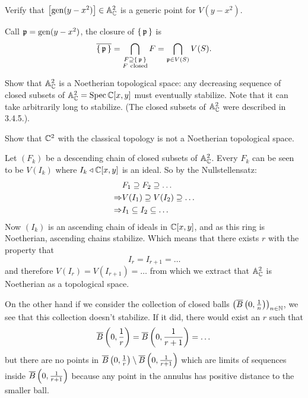 \documentclass[12pt]{memoir}
\begin{document}
\begin{Ej}[3.5.B Vakil]
    
\end{Ej}

\begin{ptcbr}

\end{ptcbr}
\fi
\begin{Ej}[3.6.M Vakil]
    Verify that $\left\lbrack\operatorname{gen}(y-x^2)\right\rbrack\in\mathbb{A}^2_{\mathbb{C}}$
 is a generic point for $V(y-x^2)$. 
\end{Ej}

\begin{ptcbr}
Call $\mathfrak{p}=\operatorname{gen}(y-x^2)$, the closure of $\{\,\mathfrak{p}\,\}$ is 
$$\ov{\set{\lie p}}=\bigcap_{\substack{F\supseteq\set{\lie p}\\ F\ \text{closed}}}F=\bigcap_{\lie p\in V(S)}V(S).$$
\end{ptcbr}

\begin{Ej}[3.6.P Vakil]
    Show that $\mathbb{A}^2_{\mathbb{C}}$ is a Noetherian topological space: any decreasing
sequence of closed subsets of $\mathbb{A}^2_{\mathbb{C}}= \operatorname{Spec}\mathbb{C}[x, y]$ must eventually stabilize. Note that it can take arbitrarily long to stabilize. (The closed subsets of $\mathbb{A}^2_{\mathbb{C}}$ were described in 3.4.5.).\par
Show that $\mathbb{C}^2$ with the classical topology is not a Noetherian topological space.
\end{Ej}

\begin{ptcbr}
Let $(F_k)$ be a descending chain of closed subsets of $\mathbb{A}^2_{\mathbb{C}}$. Every $F_k$ can be seen to be $V(I_k)$ where $I_k\triangleleft\mathbb{C}[x,y]$ is an ideal. So by the Nullstellensatz: 
\begin{align*}
    &F_1\supseteq F_2\supseteq\dots\\
    \Rightarrow&V(I_1)\supseteq V(I_2)\supseteq\dots\\
    \Rightarrow&I_1\subseteq I_2\subseteq\dots
\end{align*}
Now $(I_k)$ is an ascending chain of ideals in $\mathbb{C}[x,y]$, and as this ring is Noetherian, ascending chains stabilize. Which means that there exists $r$ with the property that 
$$I_r=I_{r+1}=\dots$$
and therefore $V(I_r)=V(I_{r+1})=\dots$ from which we extract that $\mathbb{A}^2_{\mathbb{C}}$ is Noetherian as a topological space.\par 
On the other hand if we consider the collection of closed balls $\left(\overline B\left(
0,\frac{1}{n}\right)\right)_{n\in\mathbb{N}}$, we see that this collection doesn't stabilize. If it did, there would exist an $r$ such that 
$$\overline B\left(0,\frac
1r\right)=\overline B\left(0,\frac
{1}{r+1}\right)=\dots$$
but there are no points in $\overline B\left(0,\frac
1r\right)\setminus\overline B\left(0,\frac
{1}{r+1}\right)$ which are limits of sequences inside $\overline B\left(0,\frac
{1}{r+1}\right)$ because any point in the annulus has positive distance to the smaller ball. 
\end{ptcbr}
\iffalse
\end{document}
